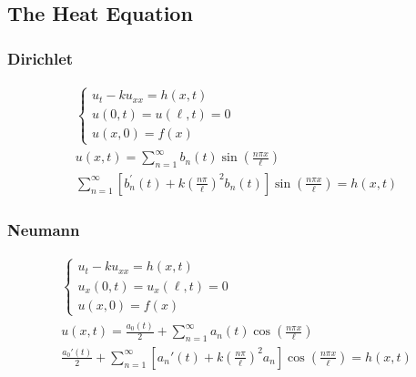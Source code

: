 \subsection{The Heat Equation}
\begin{minipage}{0.5\textwidth}
\subsubsection*{Dirichlet}
\begin{gather*}
\begin{cases}
u_{t} - ku_{xx} = h(x,t)\\
u(0,t) = u(\ell,t) = 0\\
u(x,0) = f(x)
\end{cases}\\
u(x,t) = \sum_{n=1}^{\infty}b_{n}(t)\sin{\left(\frac{n\pi x}{\ell}\right)}\\
\sum_{n=1}^{\infty}\left[b_{n}^{'}(t)+k\left(\frac{n\pi}{\ell}\right)^{2}b_{n}(t)\right]\sin{\left(\frac{
n\pi x}{\ell}\right)} = h(x,t)
\end{gather*}
\end{minipage}
\begin{minipage}{0.5\textwidth}
\subsubsection*{Neumann}
\begin{gather*}
\begin{cases}
u_{t} - ku_{xx} = h(x,t)\\
u_{x}(0,t) = u_{x}(\ell,t) = 0\\
u(x,0) = f(x)
\end{cases}\\
u(x,t) = \frac{a_{0}(t)}{2} + \sum_{n=1}^{\infty}a_{n}(t)\cos{\left(\frac{n\pi x}{\ell}\right)}\\
\frac{a_{0}'(t)}{2} + \sum_{n=1}^{\infty}\left[a_{n}'(t) +
k\left(\frac{n\pi}{\ell}\right)^{2}a_{n}\right]\cos{\left(\frac{n\pi x}{\ell}\right)} = h(x,t)
\end{gather*}
\end{minipage}
